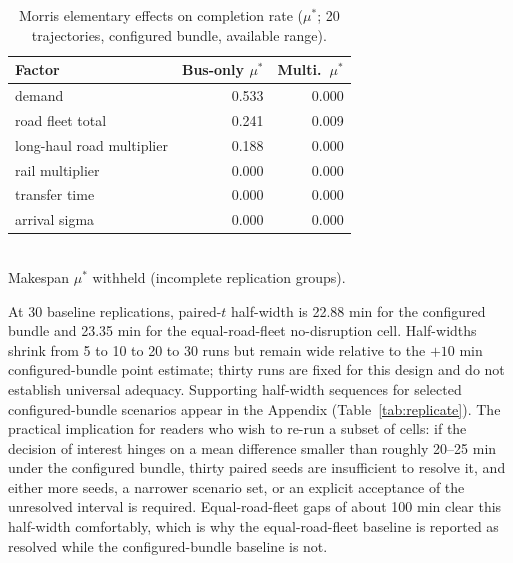 \documentclass{ieeeaccess}
\begin{document}
\begin{table}[!t]
\caption{Morris elementary effects on completion rate ($\mu^{*}$; 20 trajectories, configured bundle, available range).}
\label{tab:morris}
\centering
\footnotesize
\begin{tabular}{@{}lrr@{}}
\hline
Factor & Bus-only $\mu^{*}$ & Multi.\ $\mu^{*}$ \\
\hline
demand & 0.533 & 0.000 \\
road fleet total & 0.241 & 0.009 \\
long-haul road multiplier & 0.188 & 0.000 \\
rail multiplier & 0.000 & 0.000 \\
transfer time & 0.000 & 0.000 \\
arrival sigma & 0.000 & 0.000 \\
\hline
\end{tabular}
\\
\footnotesize{Makespan $\mu^{*}$ withheld (incomplete replication groups).}
\end{table}

At 30 baseline replications, paired-$t$ half-width is 22.88 min for the configured bundle and 23.35 min for the equal-road-fleet no-disruption cell. Half-widths shrink from 5 to 10 to 20 to 30 runs but remain wide relative to the $+10$ min configured-bundle point estimate; thirty runs are fixed for this design and do not establish universal adequacy. Supporting half-width sequences for selected configured-bundle scenarios appear in the Appendix (Table~\ref{tab:replicate}). The practical implication for readers who wish to re-run a subset of cells: if the decision of interest hinges on a mean difference smaller than roughly 20--25 min under the configured bundle, thirty paired seeds are insufficient to resolve it, and either more seeds, a narrower scenario set, or an explicit acceptance of the unresolved interval is required. Equal-road-fleet gaps of about 100 min clear this half-width comfortably, which is why the equal-road-fleet baseline is reported as resolved while the configured-bundle baseline is not.
\end{document}
